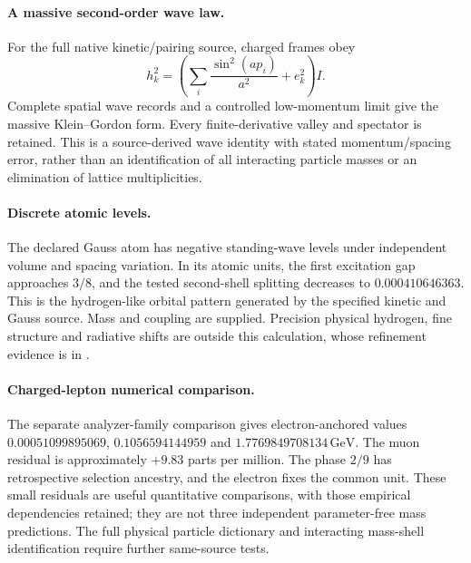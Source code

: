 \paragraph{A massive second-order wave law.}
For the full native kinetic/pairing source, charged frames obey
\[
 h_k^2=\left(\sum_i\frac{\sin^2(ap_i)}{a^2}+e_k^2\right)I.
\]
Complete spatial wave records and a controlled low-momentum limit give
the massive Klein--Gordon form. Every finite-derivative valley and
spectator is retained. This is a source-derived wave identity with
stated momentum/spacing error, rather than an identification of all
interacting particle masses or an elimination of lattice multiplicities.

\paragraph{Discrete atomic levels.}
The declared Gauss atom has negative standing-wave levels under
independent volume and spacing variation. In its atomic units, the
first excitation gap approaches $3/8$, and the tested second-shell
splitting decreases to $0.000410646363$. This is the hydrogen-like
orbital pattern generated by the specified kinetic and Gauss source.
Mass and coupling are supplied. Precision physical hydrogen, fine
structure and radiative shifts are outside this calculation, whose
refinement evidence is in .

\paragraph{Charged-lepton numerical comparison.}
The separate analyzer-family comparison gives electron-anchored values
$0.00051099895069$, $0.1056594144959$ and
$1.7769849708134\,\mathrm{GeV}$. The muon residual is approximately
$+9.83$ parts per million. The phase $2/9$ has retrospective selection
ancestry, and the electron fixes the common unit. These small residuals
are useful quantitative comparisons, with those empirical dependencies
retained; they are not three independent parameter-free mass predictions.
The full physical particle dictionary and interacting mass-shell
identification require further same-source tests.
